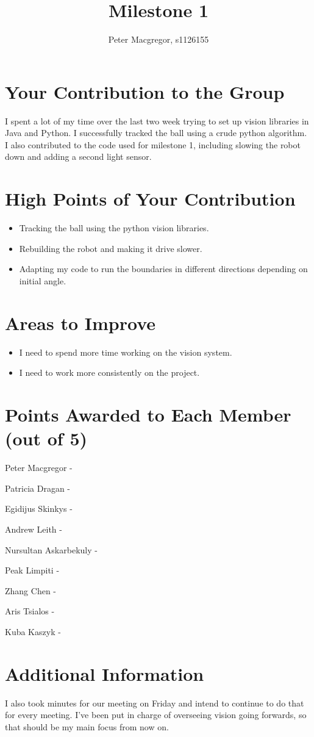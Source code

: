 \documentclass[dvips]{article}
\begin{document}
\sloppy
\title{Milestone 1}
 
\author{Peter Macgregor, s1126155}
 
\maketitle

\section{Your Contribution to the Group}
I spent a lot of my time over the last two week trying to set up vision libraries
in Java and Python. I successfully tracked the ball using a crude python algorithm.
I also contributed to the code used for milestone 1, including slowing the robot down
and adding a second light sensor.

\section{High Points of Your Contribution}
\begin{itemize}
  \item Tracking the ball using the python vision libraries.
  \item Rebuilding the robot and making it drive slower.
  \item Adapting my code to run the boundaries in different directions depending on initial angle.
\end{itemize} 

\section{Areas to Improve}
\begin{itemize}
  \item I need to spend more time working on the vision system.
  \item I need to work more consistently on the project.
\end{itemize}


\section{Points Awarded to Each Member (out of 5)}
\begin{itemize}
\begin{multicols}{2}
\item Peter Macgregor - 
\item Patricia Dragan - 
\item Egidijus Skinkys - 
\item Andrew Leith - 
\item Nursultan Askarbekuly - 
\item Peak Limpiti - 
\item Zhang Chen - 
\item Aris Tsialos - 
\item Kuba Kaszyk - 
\end{multicols}
\end{itemize}

\section{Additional Information}
I also took minutes for our meeting on Friday and intend to continue to do that for every
meeting. I've been put in charge of overseeing vision going forwards, so that should be
my main focus from now on.
\end{document}
